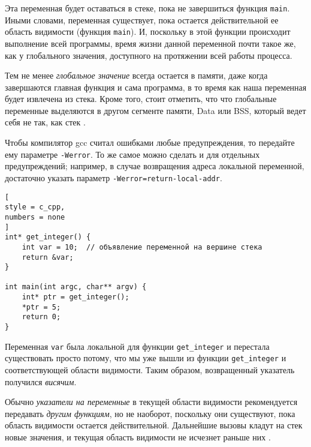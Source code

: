 \documentclass[%
	11pt,
	a4paper,
	utf8,
		]{article}
\begin{document}
Эта переменная будет оставаться в стеке, пока не завершиться функция \verb|main|. Иными словами, переменная существует, пока остается действительной ее область видимости (функция \verb|main|). И, поскольку в этой функции происходит выполнение всей программы, время жизни данной переменной почти такое же, как у глобального значения, доступного на протяжении всей работы процесса.

Тем не менее \emph{глобальное значение} всегда остается в памяти, даже когда завершаются главная функция и сама программа, в то время как наша переменная будет извлечена из стека. Кроме того, стоит отметить, что что глобальные переменные выделяются в другом сегменте памяти, Data или BSS, который ведет себя не так, как стек \cite[]{amini-extreme-c:2022}.

Чтобы компилятор gcc считал ошибками любые предупреждения, то передайте ему параметре \verb|-Werror|. То же самое можно сделать и для отдельных предупреждений; например, в случае возвращения адреса локальной переменной, достаточно указать параметр \verb|-Werror=return-local-addr|.

\begin{lstlisting}[
style = c_cpp,
numbers = none
]
int* get_integer() {
    int var = 10;  // объявление переменной на вершине стека
    return &var;
}

int main(int argc, char** argv) {
    int* ptr = get_integer();
    *ptr = 5;
    return 0;
}
\end{lstlisting}

Переменная \verb|var| была локальной для функции \verb|get_integer| и перестала существовать просто потому, что мы уже вышли из функции \verb|get_integer| и соответствующей области видимости. Таким образом, возвращенный указатель получился \emph{висячим}.

Обычно \emph{указатели на переменные} в текущей области видимости рекомендуется передавать \emph{другим функциям}, но не наоборот, поскольку они существуют, пока область видимости остается действительной. Дальнейшие вызовы кладут на стек новые значения, и текущая область видимости не исчезнет раньше них \cite[]{amini-extreme-c:2022}.
\end{document}
